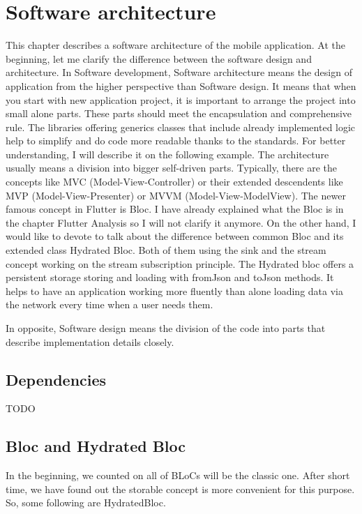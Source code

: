 \chapter{Software architecture}\label{ch:software-architecture}
This chapter describes a software architecture of the mobile application.
At the beginning, let me clarify the difference between the software design and architecture.
In Software development, Software architecture means the design of application from the higher perspective than Software design.
It means that when you start with new application project, it is important to arrange the project into small alone parts.
These parts should meet the encapsulation and comprehensive rule.
The libraries offering generics classes that include already implemented logic help to simplify and do code more readable thanks to the standards.
For better understanding, I will describe it on the following example.
The architecture usually means a division into bigger self-driven parts.
Typically, there are the concepts like MVC (Model-View-Controller) or their extended descendents like MVP (Model-View-Presenter) or MVVM (Model-View-ModelView).
The newer famous concept in Flutter is Bloc.
I have already explained what the Bloc is in the chapter Flutter Analysis so I will not clarify it anymore. %
On the other hand, I would like to devote to talk about the difference between common Bloc and its extended class Hydrated Bloc.
Both of them using the sink and the stream concept working on the stream subscription principle.
The Hydrated bloc offers a persistent storage storing and loading with fromJson and toJson methods.
It helps to have an application working more fluently than alone loading data via the network every time when a user needs them.

In opposite, Software design means the division of the code into parts that describe implementation details closely.

\section{Dependencies}\label{sec:dependencies}
TODO

\section{Bloc and Hydrated Bloc}\label{sec:bloc-and-hydrated-bloc}
In the beginning, we counted on all of BLoCs will be the classic one.
After short time, we have found out the storable concept is more convenient for this purpose.
So, some following are HydratedBloc.

